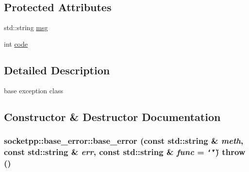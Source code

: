 \subsection*{Protected Attributes}
\begin{CompactItemize}
\item 
std::string \hyperlink{classsocketpp_1_1base__error_e4980949d1cd995e69cfa7cc9d110805}{msg}
\item 
int \hyperlink{classsocketpp_1_1base__error_131ddb6f4303ff562b49a6ff2b7f7328}{code}
\end{CompactItemize}


\subsection{Detailed Description}
base exception class 

\subsection{Constructor \& Destructor Documentation}
\hypertarget{classsocketpp_1_1base__error_bee6b6851dbaecf96259bd2dcaa84ef9}{
\subsubsection[{base\_\-error}]{\setlength{\rightskip}{0pt plus 5cm}socketpp::base\_\-error::base\_\-error (const std::string \& {\em meth}, \/  const std::string \& {\em err}, \/  const std::string \& {\em func} = {\tt \char`\"{}\char`\"{}})  throw ()}}
\label{classsocketpp_1_1base__error_bee6b6851dbaecf96259bd2dcaa84ef9}



